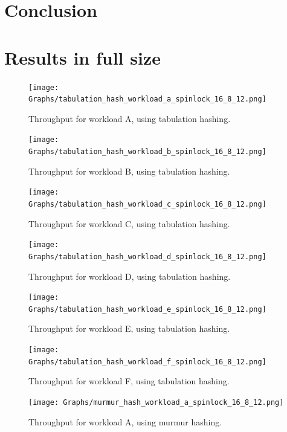 \documentclass[11pt]{report} %
\begin{document}
\chapter{Conclusion}
\label{chap:conclusion}

\appendix
\chapter{Results in full size}
\label{appendix:full_result_overview}
\begin{figure}[H]
  \centering
  \texttt{[image: Graphs/tabulation\_hash\_workload\_a\_spinlock\_16\_8\_12.png]}\\
  \caption[]{Throughput for workload A, using tabulation hashing.}\label{fig:tab_a_full}
\end{figure}
\begin{figure}[H]
  \centering
  \texttt{[image: Graphs/tabulation\_hash\_workload\_b\_spinlock\_16\_8\_12.png]}\\
  \caption[]{Throughput for workload B, using tabulation hashing.}\label{fig:tab_b_full}
\end{figure}
\begin{figure}[H]
  \centering
  \texttt{[image: Graphs/tabulation\_hash\_workload\_c\_spinlock\_16\_8\_12.png]}\\
  \caption[]{Throughput for workload C, using tabulation hashing.}\label{fig:tab_c_full}
\end{figure}
\begin{figure}[H]
  \centering
  \texttt{[image: Graphs/tabulation\_hash\_workload\_d\_spinlock\_16\_8\_12.png]}\\
  \caption[]{Throughput for workload D, using tabulation hashing.}\label{fig:tab_d_full}
\end{figure}
\begin{figure}[H]
  \centering
  \texttt{[image: Graphs/tabulation\_hash\_workload\_e\_spinlock\_16\_8\_12.png]}\\
  \caption[]{Throughput for workload E, using tabulation hashing.}\label{fig:tab_e_full}
\end{figure}
\begin{figure}[H]
  \centering
  \texttt{[image: Graphs/tabulation\_hash\_workload\_f\_spinlock\_16\_8\_12.png]}\\
  \caption[]{Throughput for workload F, using tabulation hashing.}\label{fig:tab_f_full}
\end{figure}
\begin{figure}[H]
  \centering
  \texttt{[image: Graphs/murmur\_hash\_workload\_a\_spinlock\_16\_8\_12.png]}\\
  \caption[]{Throughput for workload A, using murmur hashing.}\label{fig:mur_a_full}
\end{figure}
\end{document}
